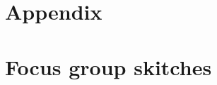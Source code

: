 
\chapter{Appendix} %

\label{AppendixA} %



%


\chapter {Focus group skitches}
\label{AppendixB} 
\setcounter{figure}{0}


